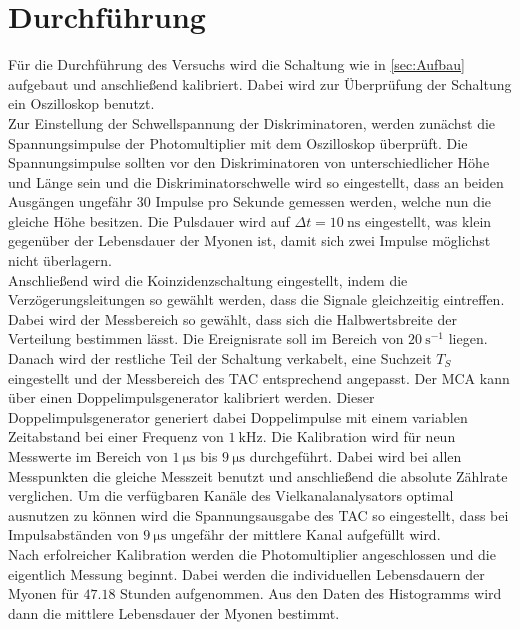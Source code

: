 \section{Durchführung}
\label{sec:Durchführung}
Für die Durchführung des Versuchs wird die Schaltung wie in \autoref{sec:Aufbau} aufgebaut und anschließend kalibriert.
Dabei wird zur Überprüfung der Schaltung ein Oszilloskop benutzt.\\
Zur Einstellung der Schwellspannung der Diskriminatoren, werden zunächst die Spannungsimpulse der Photomultiplier mit dem Oszilloskop überprüft.
Die Spannungsimpulse sollten vor den Diskriminatoren von unterschiedlicher Höhe und Länge sein und die Diskriminatorschwelle wird so eingestellt,
dass an beiden Ausgängen ungefähr $30$ Impulse pro Sekunde gemessen werden, welche nun die gleiche Höhe besitzen.
Die Pulsdauer wird auf $\Delta t = \qty{10}{\nano\second}$ eingestellt, was klein gegenüber der Lebensdauer der Myonen ist, damit sich zwei Impulse
möglichst nicht überlagern.\\
Anschließend wird die Koinzidenzschaltung eingestellt, indem die Verzögerungsleitungen so gewählt werden, dass die Signale gleichzeitig eintreffen. Dabei wird der Messbereich so gewählt,
dass sich die Halbwertsbreite der Verteilung bestimmen lässt. Die Ereignisrate soll im Bereich von $\qty{20}{\second^{-1}}$ liegen.\\
Danach wird der restliche Teil der Schaltung verkabelt, eine Suchzeit $T_S$ eingestellt und der Messbereich des TAC entsprechend angepasst.
Der MCA kann über einen Doppelimpulsgenerator kalibriert werden. Dieser Doppelimpulsgenerator generiert dabei Doppelimpulse mit einem
variablen Zeitabstand bei einer Frequenz von $\qty{1}{\kilo\Hz}$. Die Kalibration wird für neun Messwerte im Bereich von
$\qty{1}{\micro\second}$ bis $\qty{9}{\micro\second}$ durchgeführt. Dabei wird bei allen Messpunkten die gleiche Messzeit benutzt
und anschließend die absolute Zählrate verglichen.
Um die verfügbaren Kanäle des Vielkanalanalysators optimal ausnutzen zu können wird die Spannungsausgabe des
TAC so eingestellt, dass bei Impulsabständen von $\qty{9}{\micro\second}$ ungefähr der mittlere Kanal
aufgefüllt wird.\\
Nach erfolreicher Kalibration werden die Photomultiplier angeschlossen und die eigentlich Messung beginnt.
Dabei werden die individuellen Lebensdauern der Myonen für $47.18$ Stunden aufgenommen.
Aus den Daten des Histogramms wird dann die mittlere Lebensdauer der Myonen bestimmt.


